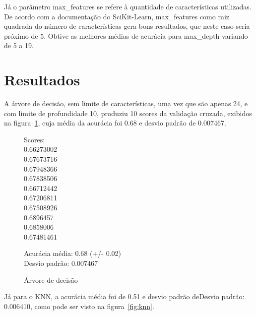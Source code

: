 \documentclass[conference]{IEEEtran}
\begin{document}
Já o parâmetro max\_features se refere à quantidade de características
utilizadas. De acordo com a documentação do SciKit-Learn, max\_features como
raiz quadrada do número de características gera bons resultados, que neste caso
seria próximo de 5. Obtive as melhores médias de acurácia para max\_depth
variando de 5 a 19.

\section{Resultados}

A árvore de decisão, sem limite de características, uma vez que são apenas 24, e com limite de profundidade 10, produziu 10 scores da validação cruzada, exibidos na figura~\ref{fig:dtree}, cuja média da acurácia foi 0.68 e desvio padrão de 0.007467.

\begin{figure}[htb]\caption{Árvore de decisão}\label{fig:dtree}
  \begin{tt}\noindent
  \begin{multicols}{3}
  Scores:\\
    0.66273002\\
    0.67673716\\
    0.67948366\\
    0.67838506\\
    0.66712442\\
    0.67206811\\
    0.67508926\\
    0.6896457\\
    0.6858006\\
    0.67481461\\
  \end{multicols}
  Acurácia média: 0.68 (+/- 0.02)\\
  Desvio padrão: 0.007467
  \end{tt}
\end{figure}

Já para o KNN, a acurácia média foi de 0.51 e desvio padrão deDesvio padrão: 0.006410, como pode ser visto na figura~\ref{fig:knn}.
\end{document}
